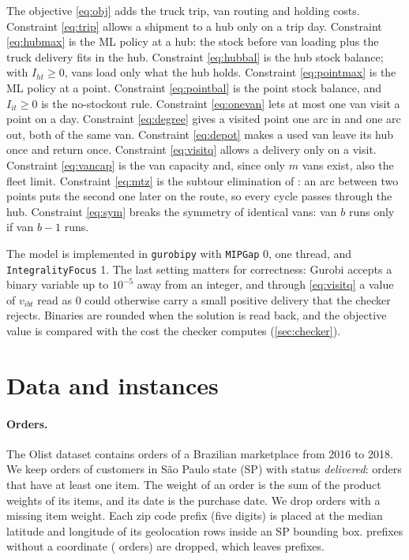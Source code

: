 \documentclass[11pt,a4paper]{article}
\begin{document}
The objective \eqref{eq:obj} adds the truck trip, van routing and holding costs.
Constraint \eqref{eq:trip} allows a shipment to a hub only on a trip day.
Constraint \eqref{eq:hubmax} is the ML policy at a hub: the stock before van loading plus the
truck delivery fits in the hub. Constraint \eqref{eq:hubbal} is the hub stock balance; with
$I_{ht} \ge 0$, vans load only what the hub holds. Constraint \eqref{eq:pointmax} is the ML
policy at a point. Constraint \eqref{eq:pointbal} is the point stock balance, and $I_{it} \ge 0$ is
the no-stockout rule. Constraint \eqref{eq:onevan} lets at most one van visit a point on a day.
Constraint \eqref{eq:degree} gives a visited point one arc in and one arc out, both of the same
van. Constraint \eqref{eq:depot} makes a used van leave its hub once and return once. Constraint
\eqref{eq:visitq} allows a delivery only on a visit. Constraint \eqref{eq:vancap} is the van
capacity and, since only $m$ vans exist, also the fleet limit. Constraint \eqref{eq:mtz} is the
subtour elimination of \citet{miller1960integer}: an arc between two points puts the second one
later on the route, so every cycle passes through the hub. Constraint \eqref{eq:sym} breaks the
symmetry of identical vans: van $b$ runs only if van $b-1$ runs.

The model is implemented in \texttt{gurobipy} with \texttt{MIPGap} 0, one thread, and
\texttt{IntegralityFocus} 1. The last setting matters for correctness: Gurobi accepts a binary
variable up to $10^{-5}$ away from an integer, and through \eqref{eq:visitq} a value of $v_{ibt}$
read as 0 could otherwise carry a small positive delivery that the checker rejects. Binaries are
rounded when the solution is read back, and the objective value is compared with the cost the
checker computes (\cref{sec:checker}).

\section{Data and instances}\label{sec:data}

\paragraph{Orders.}
The Olist dataset \citep{olist2021dataset} contains orders of a Brazilian marketplace from 2016 to
2018. We keep orders of customers in S\~ao Paulo state (SP) with status \emph{delivered}:
\nOrders{} orders that have at least one item. The weight of an order is the sum of the product
weights of its items, and its date is the purchase date. We drop \nDropWeight{} orders with a
missing item weight. Each zip code prefix (five digits) is placed at the median latitude and
longitude of its geolocation rows inside an SP bounding box. \nPrefixDropCoord{} prefixes without a coordinate (\nDropCoord{}
orders) are dropped, which leaves \nPrefixes{} prefixes.
\end{document}
